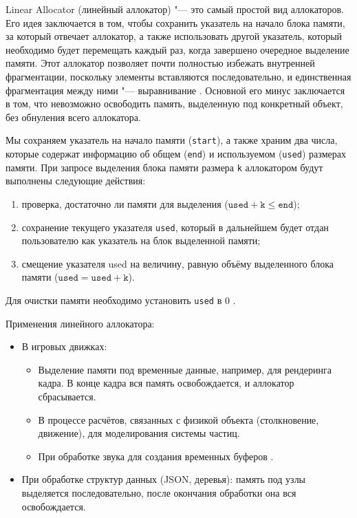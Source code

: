 Linear Allocator (линейный аллокатор) "--- это самый простой вид аллокаторов. Его идея заключается в том, чтобы сохранить указатель на начало блока памяти, за который отвечает аллокатор, а также использовать другой указатель, который необходимо будет перемещать каждый раз, когда завершено очередное выделение памяти. Этот аллокатор позволяет почти полностью избежать внутренней фрагментации, поскольку элементы вставляются последовательно, и единственная фрагментация между ними "--- выравнивание \cite{github-allocators}. Основной его минус заключается в том, что невозможно освободить память, выделенную под конкретный объект, без обнуления всего аллокатора.

Мы сохраняем указатель на начало памяти (\texttt{start}), а также храним два числа, которые содержат информацию об общем (\texttt{end}) и используемом (\texttt{used}) размерах памяти. При запросе выделения блока памяти размера \texttt{k} аллокатором будут выполнены следующие действия:

\begin{enumerate}
	\item проверка, достаточно ли памяти для выделения ($\texttt{used} + \texttt{k} \le \texttt{end}$);
    \item сохранение текущего указателя \texttt{used}, который в дальнейшем будет отдан пользователю как указатель на блок выделенной памяти;
	\item смещение указателя used на величину, равную объёму выделенного блока памяти ($\texttt{used} = \texttt{used} + \texttt{k}$).
\end{enumerate}

Для очистки памяти необходимо установить \texttt{used} в $0$ \cite{allocators}.

Применения линейного аллокатора:

\begin{itemize}
	\item В игровых движках:
	\begin{itemize}
		\item Выделение памяти под временные данные, например, для рендеринга кадра. В конце кадра вся память освобождается, и аллокатор сбрасывается.
		\item В процессе расчётов, связанных с физикой объекта (столкновение, движение), для моделирования системы частиц.
		\item При обработке звука для создания временных буферов \cite{game++}.
	\end{itemize}
	\item При обработке структур данных (JSON, деревья): память под узлы выделяется последовательно, после окончания обработки она вся освобождается.
\end{itemize}
